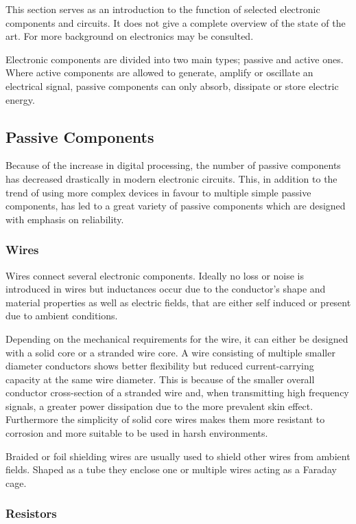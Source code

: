 This section serves as an introduction to the function of selected electronic components and circuits. It does not give a complete overview of the state of the art. For more background on electronics  may be consulted.

Electronic components are divided into two main types; passive and active ones. Where active components are allowed to generate, amplify or oscillate an electrical signal, passive components can only absorb, dissipate or store electric energy.

\subsection{Passive Components}

Because of the increase in digital processing, the number of passive components has decreased drastically in modern electronic circuits. This, in addition to the trend of using more complex devices in favour to multiple simple passive components, has led to a great variety of passive components which are designed with emphasis on reliability.

\subsubsection{Wires}

Wires connect several electronic components. Ideally no loss or noise is introduced in wires but inductances occur due to the conductor's shape and material properties as well as electric fields, that are either self induced or present due to ambient conditions.

Depending on the mechanical requirements for the wire, it can either be designed with a solid core or a stranded wire core. A wire consisting of multiple smaller diameter conductors shows better flexibility but reduced current-carrying capacity at the same wire diameter. This is because of the smaller overall conductor cross-section of a stranded wire and, when transmitting high frequency signals, a greater power dissipation due to the more prevalent skin effect. Furthermore the simplicity of solid core wires makes them more resistant to corrosion and more suitable to be used in harsh environments.

Braided or foil shielding wires are usually used to shield other wires from ambient fields. Shaped as a tube they enclose one or multiple wires acting as a Faraday cage.

\subsubsection{Resistors}

